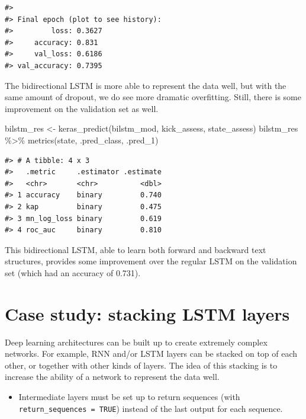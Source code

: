\documentclass[
]{krantz}
\makeatletter
\newenvironment{Shaded}{\begin{snugshade}}{\end{snugshade}}
\newcommand{\FunctionTok}[1]{\textcolor[rgb]{0.00,0.00,0.00}{#1}}
\newcommand{\NormalTok}[1]{#1}
\newcommand{\OtherTok}[1]{\textcolor[rgb]{0.56,0.35,0.01}{#1}}
\newcommand{\SpecialCharTok}[1]{\textcolor[rgb]{0.00,0.00,0.00}{#1}}
\newenvironment{kframe}{%
\medskip{}
\setlength{\fboxsep}{.8em}
 \def\at@end@of@kframe{}%
 \ifinner\ifhmode%
  \def\at@end@of@kframe{\end{minipage}}%
  \begin{minipage}{\columnwidth}%
 \fi\fi%
 \def\FrameCommand##1{\hskip\@totalleftmargin \hskip-\fboxsep
 \colorbox{shadecolor}{##1}\hskip-\fboxsep
     \hskip-\linewidth \hskip-\@totalleftmargin \hskip\columnwidth}%
 \MakeFramed {\advance\hsize-\width
   \@totalleftmargin\z@ \linewidth\hsize
   \@setminipage}}%
 {\par\unskip\endMakeFramed%
 \at@end@of@kframe}
\renewenvironment{Shaded}{\begin{kframe}}{\end{kframe}}
\newenvironment{rmdblock}[1]
  {\begin{shaded*}
  \begin{itemize}[left = -1cm, labelsep = 1cm]
  \renewcommand{\labelitemi}{
    \raisebox{-.7\height}[0pt][0pt]{
      {\setkeys{Gin}{width=3em,keepaspectratio}\texttt{[image: images/\#1]}}
    }
  }
 
  \item
  }
  {
  \end{itemize}
  \end{shaded*}
  }
\newenvironment{rmdwarning}
  {\begin{rmdblock}{warning}}
  {\end{rmdblock}}
\makeatother
\begin{document}
\begin{verbatim}
#> 
#> Final epoch (plot to see history):
#>         loss: 0.3627
#>     accuracy: 0.831
#>     val_loss: 0.6186
#> val_accuracy: 0.7395
\end{verbatim}

The bidirectional LSTM is more able to represent the data well, but with the same amount of dropout, we do see more dramatic overfitting. Still, there is some improvement on the validation set as well.

\begin{Shaded}
\begin{Highlighting}[]
\NormalTok{bilstm\_res }\OtherTok{\textless{}{-}} \FunctionTok{keras\_predict}\NormalTok{(bilstm\_mod, kick\_assess, state\_assess)}
\NormalTok{bilstm\_res }\SpecialCharTok{\%\textgreater{}\%} \FunctionTok{metrics}\NormalTok{(state, .pred\_class, .pred\_1)}
\end{Highlighting}
\end{Shaded}

\begin{verbatim}
#> # A tibble: 4 x 3
#>   .metric     .estimator .estimate
#>   <chr>       <chr>          <dbl>
#> 1 accuracy    binary         0.740
#> 2 kap         binary         0.475
#> 3 mn_log_loss binary         0.619
#> 4 roc_auc     binary         0.810
\end{verbatim}

This bidirectional LSTM, able to learn both forward and backward text structures, provides some improvement over the regular LSTM on the validation set (which had an accuracy of 0.731).

\hypertarget{case-study-stacking-lstm-layers}{%
\section{Case study: stacking LSTM layers}\label{case-study-stacking-lstm-layers}}

Deep learning architectures can be built up to create extremely complex networks. For example, RNN and/or LSTM layers can be stacked on top of each other, or together with other kinds of layers. The idea of this stacking is to increase the ability of a network to represent the data well.

\begin{rmdwarning}
Intermediate layers must be set up to return sequences (with
\texttt{return\_sequences\ =\ TRUE}) instead of the last output for each
sequence.
\end{rmdwarning}
\end{document}
